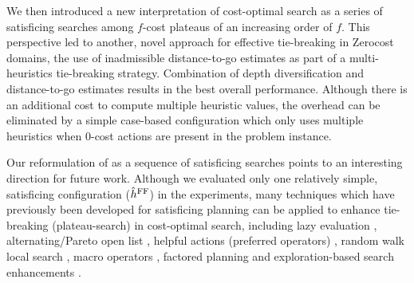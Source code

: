 We then introduced a new interpretation of cost-optimal \astar search as a series of satisficing
       searches among $f$-cost plateaus of an increasing order of $f$. 
This perspective led to another, novel approach for effective tie-breaking in Zerocost domains, the use of
       inadmissible distance-to-go estimates as part of a multi-heuristics tie-breaking strategy.
       Combination of depth diversification and distance-to-go estimates results in the best overall performance. Although there is an additional cost to compute
       multiple heuristic values, the overhead can be eliminated by a simple
       case-based configuration which only uses multiple heuristics when 0-cost actions are present in the problem instance.

Our reformulation of \astar as a sequence of satisficing searches  points to  an interesting direction for future work.
Although we evaluated only one relatively simple, satisficing configuration ($\hat{h}^{\text{FF}}$) in
the experiments, many techniques which have previously been developed for satisficing planning can be applied to enhance tie-breaking (plateau-search) in cost-optimal search, including
lazy evaluation \cite{richter2010lama}, alternating/Pareto open
list \cite{RogerH10}, helpful actions (preferred operators) \cite{Hoffmann01},
random walk local search \cite{nakhost2009monte}, macro operators
\cite{Botea2005,ChrpaVM15}, factored planning
\cite{amir2003factored,brafman2006factored,Asai2015} and
exploration-based search enhancements
\cite{valenzano2014comparison,xie14type,Valenzano2016}.

